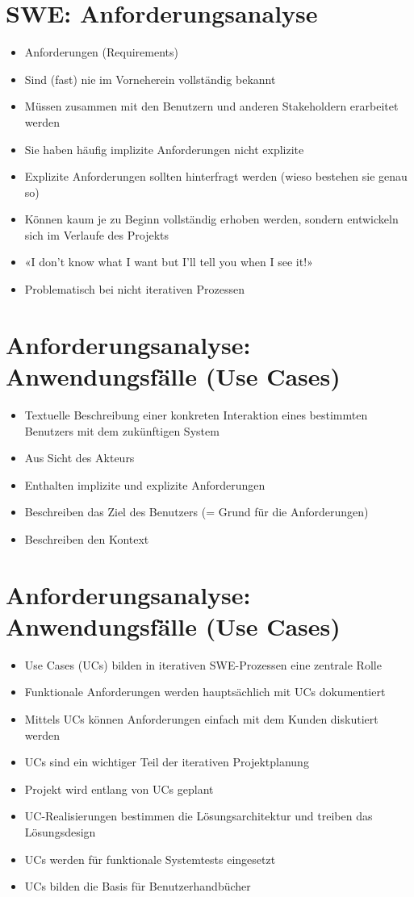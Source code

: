 \documentclass[10pt]{article}
\begin{document}
\section*{SWE: Anforderungsanalyse}
\begin{itemize}
  \item Anforderungen (Requirements)
  \item Sind (fast) nie im Vorneherein vollständig bekannt
  \item Müssen zusammen mit den Benutzern und anderen Stakeholdern erarbeitet werden
  \item Sie haben häufig implizite Anforderungen nicht explizite
  \item Explizite Anforderungen sollten hinterfragt werden (wieso bestehen sie genau so)
  \item Können kaum je zu Beginn vollständig erhoben werden, sondern entwickeln sich im Verlaufe des Projekts
  \item «I don't know what I want but I'll tell you when I see it!»
  \item Problematisch bei nicht iterativen Prozessen
\end{itemize}

\section*{Anforderungsanalyse: Anwendungsfälle (Use Cases)}
\begin{itemize}
  \item Textuelle Beschreibung einer konkreten Interaktion eines bestimmten Benutzers mit dem zukünftigen System
  \item Aus Sicht des Akteurs
  \item Enthalten implizite und explizite Anforderungen
  \item Beschreiben das Ziel des Benutzers (= Grund für die Anforderungen)
  \item Beschreiben den Kontext
\end{itemize}

\section*{Anforderungsanalyse: Anwendungsfälle (Use Cases)}
\begin{itemize}
  \item Use Cases (UCs) bilden in iterativen SWE-Prozessen eine zentrale Rolle
  \item Funktionale Anforderungen werden hauptsächlich mit UCs dokumentiert
  \item Mittels UCs können Anforderungen einfach mit dem Kunden diskutiert werden
  \item UCs sind ein wichtiger Teil der iterativen Projektplanung
  \item Projekt wird entlang von UCs geplant
  \item UC-Realisierungen bestimmen die Lösungsarchitektur und treiben das Lösungsdesign
  \item UCs werden für funktionale Systemtests eingesetzt
  \item UCs bilden die Basis für Benutzerhandbücher
\end{itemize}
\end{document}
